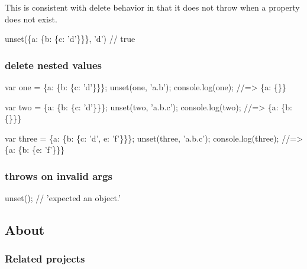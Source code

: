 This is consistent with {\ttfamily delete} behavior in that it does not throw when a property does not exist.


\begin{DoxyCode}
unset(\{a: \{b: \{c: 'd'\}\}\}, 'd') // true
\end{DoxyCode}


\subsubsection*{delete nested values}


\begin{DoxyCode}
var one = \{a: \{b: \{c: 'd'\}\}\};
unset(one, 'a.b');
console.log(one);
//=> \{a: \{\}\}

var two = \{a: \{b: \{c: 'd'\}\}\};
unset(two, 'a.b.c');
console.log(two);
//=> \{a: \{b: \{\}\}\}

var three = \{a: \{b: \{c: 'd', e: 'f'\}\}\};
unset(three, 'a.b.c');
console.log(three);
//=> \{a: \{b: \{e: 'f'\}\}\}
\end{DoxyCode}


\subsubsection*{throws on invalid args}


\begin{DoxyCode}
unset();
// 'expected an object.'
\end{DoxyCode}


\subsection*{About}

\subsubsection*{Related projects}


